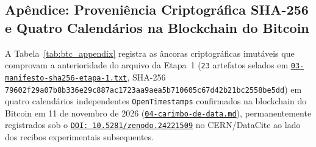 \documentclass[10pt,a4paper]{article}
\begin{document}
\subsection*{Ap\^endice: Proveni\^encia Criptogr\'afica SHA-256 e Quatro Calend\'arios na Blockchain do Bitcoin}

A Tabela~\ref{tab:btc_appendix} registra as \^ancoras criptogr\'aficas imut\'aveis que comprovam a anterioridade do arquivo da Etapa~1 (\texttt{23} artefatos selados em \href{https://drive.google.com/file/d/1PSdXe2teIQpBW0tJpxE8yiLiP2Wo1AiF/view?usp=drivesdk}{\texttt{03-manifesto-sha256-etapa-1.txt}}, SHA-256 \texttt{79602f29\allowbreak{}a07b8b33\allowbreak{}6e29c887\allowbreak{}ac1723aa\allowbreak{}9aea5b71\allowbreak{}0605c67d\allowbreak{}42b21bc2\allowbreak{}558be5dd}) em quatro calend\'arios independentes \texttt{OpenTimestamps} confirmados na blockchain do Bitcoin em 11 de novembro de 2026 (\href{https://drive.google.com/file/d/1OwjPlXRdBPydtqypoRHNfByfMSmx-Bwb/view?usp=drivesdk}{\texttt{04-carimbo-de-data.md}}), permanentemente registrados sob o \href{https://doi.org/10.5281/zenodo.24221509}{\texttt{DOI:\,10.5281/zenodo.24221509}} no CERN/DataCite ao lado dos recibos experimentais subsequentes.
\end{document}
